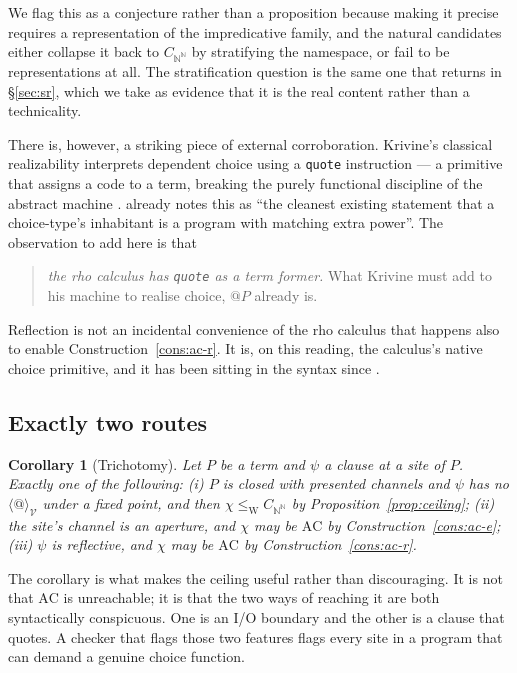 \documentclass[11pt]{article}
\theoremstyle{definition}
\theoremstyle{plain}
\newtheorem{corollary}{Corollary}
\theoremstyle{remark}
\newcommand{\V}{\mathcal{V}}
\newcommand{\AC}{\mathrm{AC}}
\newcommand{\lw}{\leq_{\mathrm{W}}}
\newcommand{\Bai}{\mathbb{N}^{\mathbb{N}}}
\begin{document}
We flag this as a conjecture rather than a proposition because making it precise
requires a representation of the impredicative family, and the natural candidates
either collapse it back to $C_{\Bai}$ by stratifying the namespace, or fail to be
representations at all. The stratification question is the same one that returns in
\S\ref{sec:sr}, which we take as evidence that it is the real content rather than a
technicality.

There is, however, a striking piece of external corroboration. Krivine's classical
realizability interprets dependent choice using a \texttt{quote} instruction --- a
primitive that assigns a code to a term, breaking the purely functional discipline of
the abstract machine \cite{krivine}. \cite{choicesched} already notes this as ``the
cleanest existing statement that a choice-type's inhabitant is a program with matching
extra power''. The observation to add here is that

\begin{quote}
\emph{the rho calculus has \texttt{quote} as a term former.} What Krivine must add to
his machine to realise choice, $@P$ already is.
\end{quote}

\noindent
Reflection is not an incidental convenience of the rho calculus that happens also to
enable Construction~\ref{cons:ac-r}. It is, on this reading, the calculus's native
choice primitive, and it has been sitting in the syntax since \cite{Mer05}.

\subsection{Exactly two routes}\label{ssec:tworoutes}

\begin{corollary}[Trichotomy]\label{cor:trichotomy}
Let $P$ be a term and $\psi$ a clause at a site of $P$. Exactly one of the following:
(i) $P$ is closed with presented channels and $\psi$ has no $\langle @ \rangle_\V$
under a fixed point, and then $\chi \lw C_{\Bai}$ by Proposition~\ref{prop:ceiling};
(ii) the site's channel is an aperture, and $\chi$ may be $\AC$ by
Construction~\ref{cons:ac-e}; (iii) $\psi$ is reflective, and $\chi$ may be $\AC$ by
Construction~\ref{cons:ac-r}.
\end{corollary}

The corollary is what makes the ceiling useful rather than discouraging. It is not that
$\AC$ is unreachable; it is that the two ways of reaching it are both syntactically
conspicuous. One is an I/O boundary and the other is a clause that quotes. A checker
that flags those two features flags every site in a program that can demand a genuine
choice function.
\end{document}
